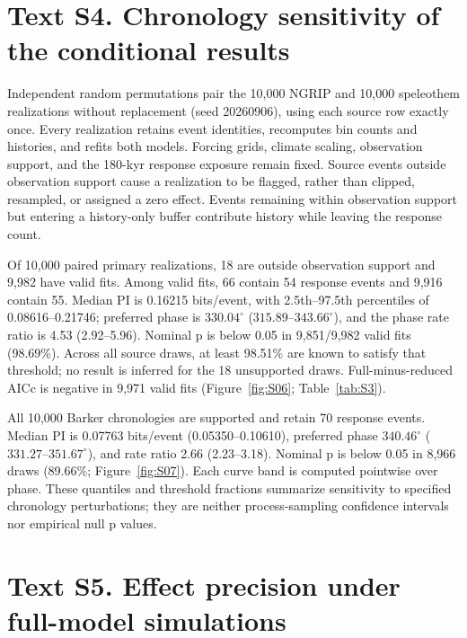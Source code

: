 \documentclass[11pt]{article}
\begin{document}
\section*{Text S4. Chronology sensitivity of the conditional results}

Independent random permutations pair the 10,000 NGRIP and 10,000 speleothem realizations without replacement (seed 20260906), using each source row exactly once. Every realization retains event identities, recomputes bin counts and histories, and refits both models. Forcing grids, climate scaling, observation support, and the 180-kyr response exposure remain fixed. Source events outside observation support cause a realization to be flagged, rather than clipped, resampled, or assigned a zero effect. Events remaining within observation support but entering a history-only buffer contribute history while leaving the response count.

Of 10,000 paired primary realizations, 18 are outside observation support and 9,982 have valid fits. Among valid fits, 66 contain 54 response events and 9,916 contain 55. Median PI is 0.16215 bits/event, with 2.5th--97.5th percentiles of 0.08616--0.21746; preferred phase is $330.04^\circ$ ($315.89$--$343.66^\circ$), and the phase rate ratio is 4.53 (2.92--5.96). Nominal p is below 0.05 in 9,851/9,982 valid fits (98.69\%). Across all source draws, at least 98.51\% are known to satisfy that threshold; no result is inferred for the 18 unsupported draws. Full-minus-reduced AICc is negative in 9,971 valid fits (Figure~\ref{fig:S06}; Table~\ref{tab:S3}).

All 10,000 Barker chronologies are supported and retain 70 response events. Median PI is 0.07763 bits/event (0.05350--0.10610), preferred phase $340.46^\circ$ ($331.27$--$351.67^\circ$), and rate ratio 2.66 (2.23--3.18). Nominal p is below 0.05 in 8,966 draws (89.66\%; Figure~\ref{fig:S07}). Each curve band is computed pointwise over phase. These quantiles and threshold fractions summarize sensitivity to specified chronology perturbations; they are neither process-sampling confidence intervals nor empirical null p values.

\section*{Text S5. Effect precision under full-model simulations}
\end{document}
